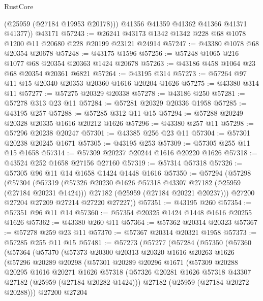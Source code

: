 \begin{lexlean}{RustCore}
\begin{coremodule}
          (@25959 (@27184 @19953 @20178)))
        @41356
        @41359
        @41362
        @41366
        @41371
        @41377))
    @43171
@57243 := @26241 @43173 @1342 @1342 @228 @68 @1078 @1200 @11 @20680 @228 @20199 @23121 @24914
@57247 := @43380 @1078 @68 @20354 @20678
@57248 := @43175 @1596
@57256 := @57248 @1065 @216 @1077 @68 @20354 @20363 @1424 @20678
@57263 := @43186 @458 @1064 @23 @68 @20354 @20361 @6821
@57264 := @43195 @314
@57273 := @57264 @97 @11 @15 @20340 @20353 @20360 @1616 @20204 @1626
@57275 := @43380 @314 @11
@57277 := @57275 @20329 @20338
@57278 := @43186 @250
@57281 := @57278 @313 @23 @11
@57284 := @57281 @20329 @20336 @1958
@57285 := @43195 @257
@57288 := @57285 @312 @11 @15
@57294 := @57288 @20249 @20328 @20335 @1616 @20212 @1626
@57296 := @43380 @257 @11
@57298 := @57296 @20238 @20247
@57301 := @43385 @256 @23 @11
@57304 := @57301 @20238 @20245 @1671
@57305 := @43195 @253
@57309 := @57305 @255 @11 @15 @1658
@57314 := @57309 @20237 @20244 @1616 @20220 @1626
@57318 := @43524 @252 @1658 @27156 @27160
@57319 := @57314 @57318
@57326 := @57305 @96 @11 @14 @1658 @1424 @1448 @1616
@57350 := @57294
    (@57298
      (@57304
        (@57319
          (@57326 @20230 @1626 @57318 @43307 @27182 (@25959 (@27184 @20231 @1424)))
          @27182
          (@25959 (@27184 @20221 @20237)))
        @27200
        @27204
        @27209
        @27214
        @27220
        @27227))
@57351 := @43195 @260
@57354 := @57351 @96 @11 @14
@57360 := @57354 @20325 @1424 @1448 @1616 @20255 @1626
@57362 := @43380 @260 @11
@57364 := @57362 @20314 @20323
@57367 := @57278 @259 @23 @11
@57370 := @57367 @20314 @20321 @1958
@57373 := @57285 @255 @11 @15
@57481 := @57273
    (@57277
      (@57284
        (@57350
          (@57360
            (@57364
              (@57370
                (@57373
                  @20300
                  @20313
                  @20320
                  @1616
                  @20263
                  @1626
                  (@57296
                    @20289
                    @20298
                    (@57301
                      @20289
                      @20296
                      @1671
                      (@57309
                        @20288
                        @20295
                        @1616
                        @20271
                        @1626
                        @57318
                        (@57326 @20281 @1626 @57318 @43307 @27182 (@25959 (@27184 @20282 @1424)))
                        @27182
                        (@25959 (@27184 @20272 @20288)))
                      @27200
                      @27204

\end{coremodule}
\end{lexlean}

